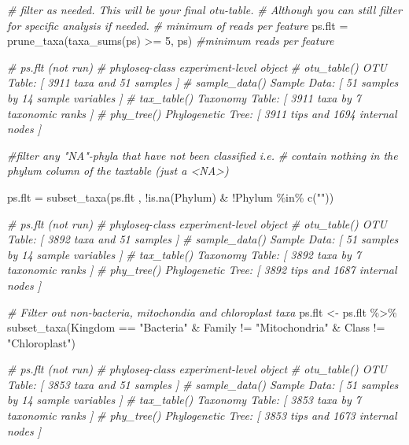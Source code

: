 \documentclass[
]{book}
\newenvironment{Shaded}{\begin{snugshade}}{\end{snugshade}}
\newcommand{\CommentTok}[1]{\textcolor[rgb]{0.56,0.35,0.01}{\textit{#1}}}
\newcommand{\DecValTok}[1]{\textcolor[rgb]{0.00,0.00,0.81}{#1}}
\newcommand{\FunctionTok}[1]{\textcolor[rgb]{0.00,0.00,0.00}{#1}}
\newcommand{\NormalTok}[1]{#1}
\newcommand{\OtherTok}[1]{\textcolor[rgb]{0.56,0.35,0.01}{#1}}
\newcommand{\SpecialCharTok}[1]{\textcolor[rgb]{0.00,0.00,0.00}{#1}}
\newcommand{\StringTok}[1]{\textcolor[rgb]{0.31,0.60,0.02}{#1}}
\begin{document}
\begin{Shaded}
\begin{Highlighting}[]
\CommentTok{\# filter as needed. This will be your final otu{-}table.}
\CommentTok{\# Although you can still filter for specific analysis if needed.}
\CommentTok{\# minimum of reads per feature}
\NormalTok{ps.flt }\OtherTok{=} \FunctionTok{prune\_taxa}\NormalTok{(}\FunctionTok{taxa\_sums}\NormalTok{(ps) }\SpecialCharTok{\textgreater{}=} \DecValTok{5}\NormalTok{, ps) }\CommentTok{\#minimum reads per feature}

\CommentTok{\# ps.flt (not run)}
\CommentTok{\# phyloseq{-}class experiment{-}level object}
\CommentTok{\# otu\_table()   OTU Table:         [ 3911 taxa and 51 samples ]}
\CommentTok{\# sample\_data() Sample Data:       [ 51 samples by 14 sample variables ]}
\CommentTok{\# tax\_table()   Taxonomy Table:    [ 3911 taxa by 7 taxonomic ranks ]}
\CommentTok{\# phy\_tree()    Phylogenetic Tree: [ 3911 tips and 1694 internal nodes ]}

\CommentTok{\#filter any "NA"{-}phyla that have not been classified i.e. }
\CommentTok{\# contain nothing in the phylum column of the taxtable (just a \textless{}NA\textgreater{})}

\NormalTok{ps.flt  }\OtherTok{=} \FunctionTok{subset\_taxa}\NormalTok{(ps.flt , }\SpecialCharTok{!}\FunctionTok{is.na}\NormalTok{(Phylum) }\SpecialCharTok{\&} \SpecialCharTok{!}\NormalTok{Phylum }\SpecialCharTok{\%in\%} \FunctionTok{c}\NormalTok{(}\StringTok{""}\NormalTok{))}

\CommentTok{\# ps.flt (not run)}
\CommentTok{\# phyloseq{-}class experiment{-}level object}
\CommentTok{\# otu\_table()   OTU Table:         [ 3892 taxa and 51 samples ]}
\CommentTok{\# sample\_data() Sample Data:       [ 51 samples by 14 sample variables ]}
\CommentTok{\# tax\_table()   Taxonomy Table:    [ 3892 taxa by 7 taxonomic ranks ]}
\CommentTok{\# phy\_tree()    Phylogenetic Tree: [ 3892 tips and 1687 internal nodes ]}
  
\CommentTok{\# Filter out non{-}bacteria, mitochondia and chloroplast taxa}
\NormalTok{ps.flt }\OtherTok{\textless{}{-}}\NormalTok{ ps.flt }\SpecialCharTok{\%\textgreater{}\%}
  \FunctionTok{subset\_taxa}\NormalTok{(Kingdom }\SpecialCharTok{==} \StringTok{"Bacteria"} \SpecialCharTok{\&}\NormalTok{ Family  }\SpecialCharTok{!=} \StringTok{"Mitochondria"} \SpecialCharTok{\&}\NormalTok{ Class   }\SpecialCharTok{!=} \StringTok{"Chloroplast"}\NormalTok{)}

\CommentTok{\# ps.flt (not run)}
\CommentTok{\# phyloseq{-}class experiment{-}level object}
\CommentTok{\# otu\_table()   OTU Table:         [ 3853 taxa and 51 samples ]}
\CommentTok{\# sample\_data() Sample Data:       [ 51 samples by 14 sample variables ]}
\CommentTok{\# tax\_table()   Taxonomy Table:    [ 3853 taxa by 7 taxonomic ranks ]}
\CommentTok{\# phy\_tree()    Phylogenetic Tree: [ 3853 tips and 1673 internal nodes ]}


\end{Highlighting}
\end{Shaded}
\end{document}
